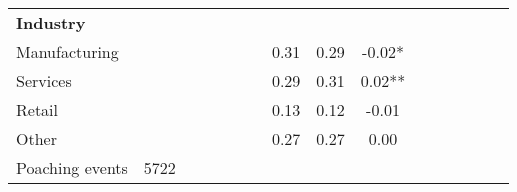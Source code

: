 {\begin{tabular}{l*{5}{ccc}}
\\ \textbf{Industry}&            &            &            &            &            &            &            &            &               \\
Manufacturing       &            &            &            &            &            &            &        0.31&        0.29&       -0.02*  \\
Services            &            &            &            &            &            &            &        0.29&        0.31&        0.02** \\
Retail              &            &            &            &            &            &            &        0.13&        0.12&       -0.01   \\
Other               &            &            &            &            &            &            &        0.27&        0.27&        0.00   \\
\midrule
Poaching events     &        5722&            &            &            &            &            &            &            &               \\
\bottomrule
\end{tabular}
}
